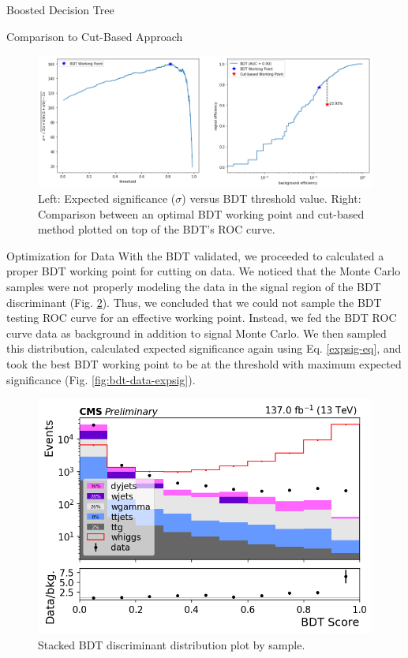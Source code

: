 \begin{section}{Boosted Decision Tree}
\begin{subsection}{Comparison to Cut-Based Approach}
\begin{figure}[htb]
\begin{center}
\includegraphics[width=.95\linewidth]{Dissertation/fig/bdt-vs-cuts.png}
\end{center}
\caption{Left: Expected significance ($\sigma$) versus BDT threshold value. Right: Comparison between an optimal BDT working point and cut-based method plotted on top of the BDT's ROC curve.}
\label{fig:bdt-vs-cuts}
\end{figure}
\end{subsection}
\begin{subsection}{Optimization for Data}
With the BDT validated, we proceeded to calculated a proper BDT working point for cutting on data. We noticed that the Monte Carlo samples were not properly modeling the data in the signal region of the BDT discriminant (Fig. \ref{fig:bdt-thresh-dist}). Thus, we concluded that we could not sample the BDT testing ROC curve for an effective working point. Instead, we fed the BDT ROC curve data as background in addition to signal Monte Carlo. We then sampled this distribution, calculated expected significance again using Eq. \ref{expsig-eq}, and took the best BDT working point to be at the threshold with maximum expected significance (Fig. \ref{fig:bdt-data-expsig}).

\begin{figure}[htb]
\begin{center}
\includegraphics[width=.95\linewidth]{Dissertation/fig/bdt-threshBySample.png}
\end{center}
\caption{Stacked BDT discriminant distribution plot by sample.}
\label{fig:bdt-thresh-dist}
\end{figure}


\end{subsection}
\end{section}

